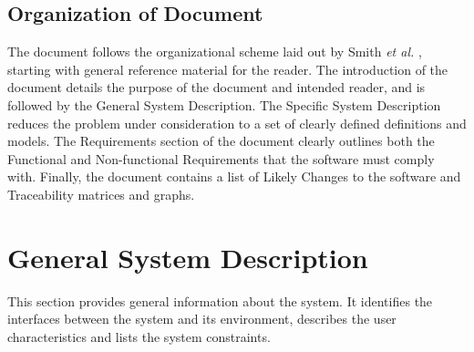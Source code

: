 \documentclass[12pt]{article}
\begin{document}
%

\subsection{Organization of Document}

The document follows the organizational scheme laid out by Smith \textit{et al.}
\cite{SmithAndLai2005, smith_requirements_2007}, starting with general reference
material for the reader. The introduction of the document details the purpose of
the document and intended reader, and is followed by the General System
Description. The Specific System Description reduces the problem under
consideration to a set of clearly defined definitions and models. The
Requirements section of the document clearly outlines both the Functional and
Non-functional Requirements that the software must comply with. Finally, the
document contains a list of Likely Changes to the software and Traceability
matrices and graphs.



\section{General System Description}

This section provides general information about the system.  It identifies the
interfaces between the system and its environment, describes the user
characteristics and lists the system constraints.  
%
\end{document}
